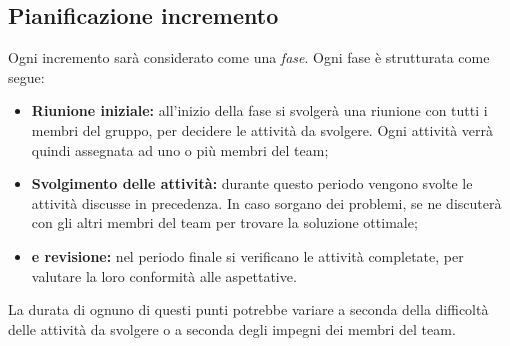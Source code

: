 \subsection{Pianificazione incremento}
Ogni incremento sarà considerato come una \textit{fase}. Ogni fase è strutturata come segue:
\begin{itemize}
\item \textbf{Riunione iniziale:} all'inizio della fase si svolgerà una riunione con tutti i membri del gruppo, per decidere le attività da svolgere. Ogni attività verrà quindi assegnata ad uno o più membri del team;
\item \textbf{Svolgimento delle attività:} durante questo periodo vengono svolte le attività discusse in precedenza. In caso sorgano dei problemi, se ne discuterà con gli altri membri del team per trovare la soluzione ottimale;
\item \textbf{ e revisione:} nel periodo finale si verificano le attività completate, per valutare la loro conformità alle aspettative.
\end{itemize}
La durata di ognuno di questi punti potrebbe variare a seconda della difficoltà delle attività da svolgere o a seconda degli impegni dei membri del team.
\newpage

